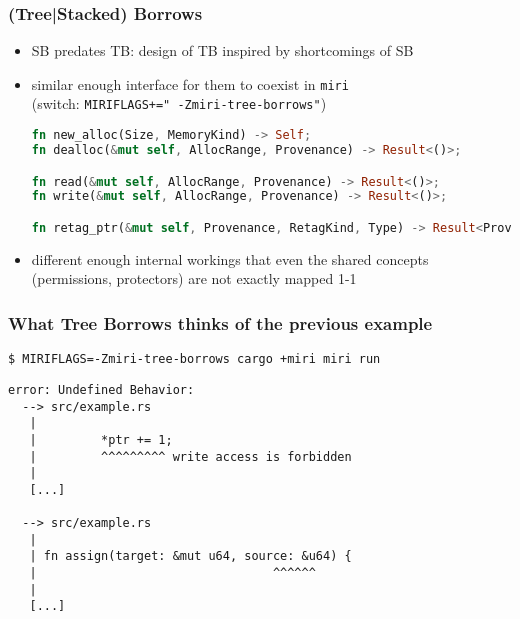 \begin{frame}[fragile]
    \frametitle{(Tree|Stacked) Borrows}
    \begin{itemize}
        \item SB predates TB: design of TB inspired by shortcomings of SB
        \item similar enough interface for them to coexist in \texttt{miri}\\
            (switch: \texttt{MIRIFLAGS+=" -Zmiri-tree-borrows"})
            \begin{minipage}{0.9\textwidth}
            \begin{block}{}
                \begin{lstlisting}[language=rust, basicstyle=\ttfamily\fontsize{7}{8}\selectfont]
fn new_alloc(Size, MemoryKind) -> Self;
fn dealloc(&mut self, AllocRange, Provenance) -> Result<()>;

fn read(&mut self, AllocRange, Provenance) -> Result<()>;
fn write(&mut self, AllocRange, Provenance) -> Result<()>;

fn retag_ptr(&mut self, Provenance, RetagKind, Type) -> Result<Provenance>;
                \end{lstlisting}
            \end{block}
            \end{minipage}
        \item different enough internal workings that even the shared
        concepts (permissions, protectors) are not exactly mapped 1-1
    \end{itemize}
\end{frame}

\begin{frame}[fragile]
    \frametitle{What Tree Borrows thinks of the previous example}
    \texttt{\$ MIRIFLAGS=-Zmiri-tree-borrows cargo +miri miri run}
        \begin{lstlisting}
error: Undefined Behavior:
  --> src/example.rs
   |
   |         *ptr += 1;
   |         ^^^^^^^^^ write access is forbidden
   |
   [...]

  --> src/example.rs
   |
   | fn assign(target: &mut u64, source: &u64) {
   |                                 ^^^^^^
   |
   [...]
        \end{lstlisting}
\end{frame}
